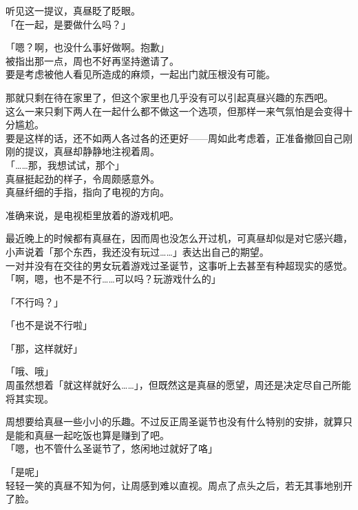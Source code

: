 听见这一提议，真昼眨了眨眼。\\

「在一起，是要做什么吗？」

「嗯？啊，也没什么事好做啊。抱歉」\\

被指出那一点，周也不好再坚持邀请了。\\

要是考虑被他人看见所造成的麻烦，一起出门就压根没有可能。

那就只剩在待在家里了，但这个家里也几乎没有可以引起真昼兴趣的东西吧。\\

这么一来只剩下两人在一起什么都不做这一个选项，但那样一来气氛怕是会变得十分尴尬。\\

要是这样的话，还不如两人各过各的还更好——周如此考虑着，正准备撤回自己刚刚的提议，真昼却静静地注视着周。\\

「……那，我想试试，那个」\\

真昼挺起劲的样子，令周颇感意外。\\

真昼纤细的手指，指向了电视的方向。

准确来说，是电视柜里放着的游戏机吧。

最近晚上的时候都有真昼在，因而周也没怎么开过机，可真昼却似是对它感兴趣，小声说着「那个东西，我还没有玩过……」表达出自己的期望。\\

一对并没有在交往的男女玩着游戏过圣诞节，这事听上去甚至有种超现实的感觉。\\

「啊，嗯，也不是不行……可以吗？玩游戏什么的」

「不行吗？」

「也不是说不行啦」

「那，这样就好」

「哦、哦」\\

周虽然想着「就这样就好么……」，但既然这是真昼的愿望，周还是决定尽自己所能将其实现。

周想要给真昼一些小小的乐趣。不过反正周圣诞节也没有什么特别的安排，就算只是能和真昼一起吃饭也算是赚到了吧。\\

「嗯，也不管什么圣诞节了，悠闲地过就好了咯」

「是呢」\\

轻轻一笑的真昼不知为何，让周感到难以直视。周点了点头之后，若无其事地别开了脸。
